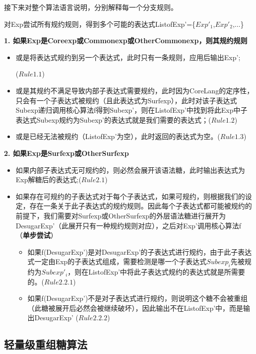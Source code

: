接下来对整个算法语言说明，分别解释每一个分支规则。

对Exp尝试所有规约规则，得到多个可能的表达式ListofExp'=\{$Exp'_{1}$,$Exp'_{2}$,$\ldots$\}

\begin{flushleft}
	\large{\bfseries{
			1.	如果Exp是Coreexp或Commonexp或OtherCommonexp，则其规约规则	
		}	
	}	
\end{flushleft}
\begin{itemize}
	\item 或是将表达式规约到另一个表达式，此时只有一条规则，应用后输出Exp';
	
	($Rule1.1$)
	\item 或是其规约不满足导致内部子表达式需要规约，此时因为CoreLang的定序性，只会有一个子表达式被规约（且此表达式为Surfexp），此时对该子表达式Subexp递归调用核心算法f得到Subexp’，则在ListofExp'中找到将此Exp中子表达式Subexp规约为Subexp’的表达式就是我们需要的表达式；($Rule1.2$)
	\item 或是已经无法被规约（ListofExp'为空），此时返回的表达式为空。($Rule1.3$)
\end{itemize}

\begin{flushleft}
	\large{\bfseries{
			2.	如果Exp是Surfexp或OtherSurfexp	
		}
	}
\end{flushleft}
\begin{itemize}
	\item 如果内部子表达式无可规约的，则必然会展开该语法糖，此时输出表达式为Exp解糖后的表达式;($Rule2.1$)
	\item 如果存在可规约的子表达式对于每个子表达式，如果可规约，则根据我们的设定，存在一条关于此子表达式的规约规则。因此每个子表达式都可能被规约的前提下，我们需要对Surfexp或OtherSurfexp的外层语法糖进行展开为DesugarExp’（此展开只有一种规约规则对应），之后对Exp’调用核心算法f（{\bfseries 单步尝试}）
	\begin{itemize}
		\item 如果f(DesugarExp')是对DesugarExp'的子表达式进行规约，由于此子表达式一定由Exp的子表达式组成，需要检测是哪一个子表达式$Subexp_{i}$先被规约为$Subexp'_{i}$，则在ListofExp'中将此子表达式规约的表达式就是所需要的。($Rule2.2.1$)
		\item 如果f(DesugarExp')不是对子表达式进行规约，则说明这个糖不会被重组（此糖被展开后必然会被继续破坏），因此输出不在ListofExp'中，而是输出DesugarExp'
			($Rule2.2.2$)
	\end{itemize}
\end{itemize}

\subsection{轻量级重组糖算法}

